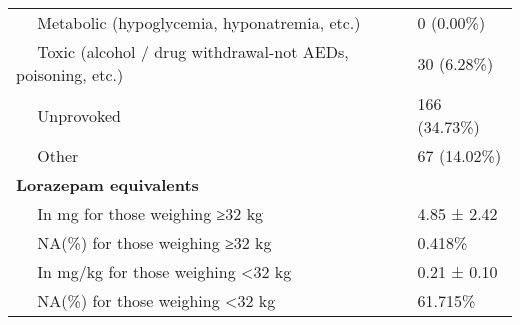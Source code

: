 \documentclass[
]{article}
\begin{document}
\begin{longtable}[]{@{}ll@{}}
\begin{minipage}[t]{0.73\columnwidth}\raggedright
~~ Metabolic (hypoglycemia, hyponatremia, etc.)\strut
\end{minipage} & \begin{minipage}[t]{0.21\columnwidth}\raggedright
0 (0.00\%)\strut
\end{minipage}\tabularnewline
\begin{minipage}[t]{0.73\columnwidth}\raggedright
~~ Toxic (alcohol / drug withdrawal-not AEDs, poisoning, etc.)\strut
\end{minipage} & \begin{minipage}[t]{0.21\columnwidth}\raggedright
30 (6.28\%)\strut
\end{minipage}\tabularnewline
\begin{minipage}[t]{0.73\columnwidth}\raggedright
~~ Unprovoked\strut
\end{minipage} & \begin{minipage}[t]{0.21\columnwidth}\raggedright
166 (34.73\%)\strut
\end{minipage}\tabularnewline
\begin{minipage}[t]{0.73\columnwidth}\raggedright
~~ Other\strut
\end{minipage} & \begin{minipage}[t]{0.21\columnwidth}\raggedright
67 (14.02\%)\strut
\end{minipage}\tabularnewline
\begin{minipage}[t]{0.73\columnwidth}\raggedright
\textbf{Lorazepam equivalents}\strut
\end{minipage} & \begin{minipage}[t]{0.21\columnwidth}\raggedright
~~\strut
\end{minipage}\tabularnewline
\begin{minipage}[t]{0.73\columnwidth}\raggedright
~~ In mg for those weighing ≥32 kg\strut
\end{minipage} & \begin{minipage}[t]{0.21\columnwidth}\raggedright
4.85 ± 2.42\strut
\end{minipage}\tabularnewline
\begin{minipage}[t]{0.73\columnwidth}\raggedright
~~ NA(\%) for those weighing ≥32 kg\strut
\end{minipage} & \begin{minipage}[t]{0.21\columnwidth}\raggedright
0.418\%\strut
\end{minipage}\tabularnewline
\begin{minipage}[t]{0.73\columnwidth}\raggedright
~~ In mg/kg for those weighing \textless32 kg\strut
\end{minipage} & \begin{minipage}[t]{0.21\columnwidth}\raggedright
0.21 ± 0.10\strut
\end{minipage}\tabularnewline
\begin{minipage}[t]{0.73\columnwidth}\raggedright
~~ NA(\%) for those weighing \textless32 kg\strut
\end{minipage} & \begin{minipage}[t]{0.21\columnwidth}\raggedright
61.715\%\strut
\end{minipage}\tabularnewline
\bottomrule
\end{longtable}
\end{document}
